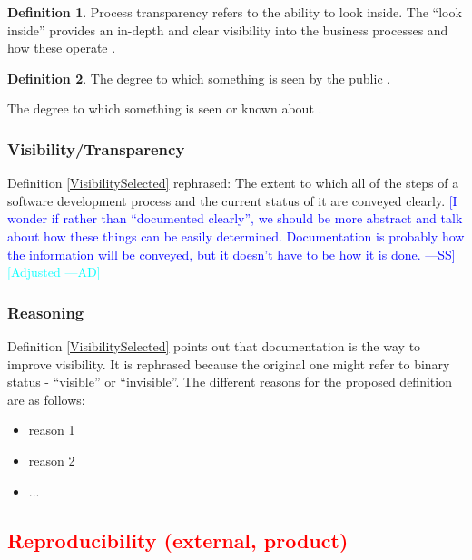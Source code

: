 \documentclass[letterpaper, cleveref]{lipics-v2019}
\newcommand{\authornote}[3]{\textcolor{#1}{[#3 ---#2]}}
\newcommand{\authornote}[3]{}
\newcommand{\wss}[1]{\authornote{blue}{SS}{#1}} %
\newcommand{\ad}[1]{\authornote{cyan}{AD}{#1}} %
\newcommand{\notdone}[1]{\textcolor{red}{#1}}
\theoremstyle{definition}
\newtheorem{defn}{Definition}
\begin{document}
\begin{defn}
  Process transparency refers to the ability to look inside. The “look inside”
  provides an in-depth and clear visibility into the business processes and how
  these operate \citep{PRIME2019}.
\end{defn}

\begin{defn}
The degree to which something is seen by the public
\citep{CambridgeVisibility2019}.
	
The degree to which something is seen or known about
\citep{CambridgeVisibility2019}.
\end{defn}

\begin{mybox}
\subsubsection*{Visibility/Transparency} 
Definition \ref{VisibilitySelected} rephrased: The extent to which all of the
steps of a software development process and the current status of it are
conveyed clearly. \wss{I wonder if rather than ``documented clearly'', we should
be more abstract and talk about how these things can be easily determined.
Documentation is probably how the information will be conveyed, but it doesn't
have to be how it is done.}  \ad{Adjusted}
\end{mybox}

\subsubsection*{Reasoning}

Definition \ref{VisibilitySelected} points out that documentation is the way to
improve visibility. It is rephrased because the original one might refer to
binary status - ``visible'' or ``invisible''.  The different reasons for the
proposed definition are as follows:

\begin{itemize}
  \item reason 1
  \item reason 2
  \item ...
\end{itemize}


\subsection{\notdone{Reproducibility (external, product)}} %
\end{document}
